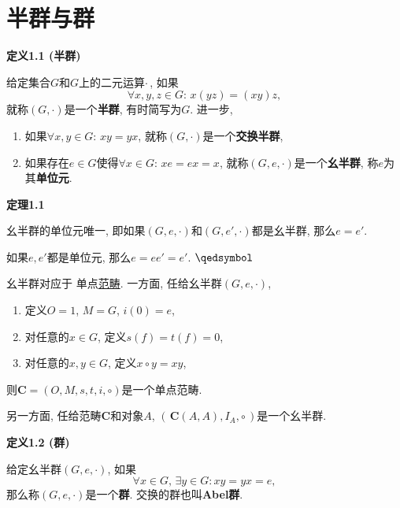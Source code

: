 \documentclass[UTF8]{ctexart}
\begin{document}
\setlength{\abovedisplayskip}{1pt}
\setlength{\belowdisplayskip}{1pt}

\section{半群与群}

\hypertarget{sec:定义1.1}{}
\noindent\textbf{定义1.1 (半群)}

给定集合$G$和$G$上的二元运算$\cdot$\,, 如果
\[
    \forall x,y,z\in G:\,x(yz)=(xy)z,
\]
就称$(G,\cdot)$是一个\textbf{半群}, 有时简写为$G$. 进一步,
\begin{enumerate}
    \item 如果$\forall x,y\in G:\,xy=yx$, 就称$(G,\cdot)$是一个\textbf{交换半群},
    \item 如果存在$e\in G$使得$\forall x\in G:\,xe=ex=x$,
    就称$(G,e,\cdot)$是一个\textbf{幺半群}, 称$e$为其\textbf{单位元}.
\end{enumerate}

\vspace{10pt}

\hypertarget{sec:定理1.1}{}
\noindent\textbf{定理1.1}

幺半群的单位元唯一, 即如果$(G,e,\cdot)$和$(G,e',\cdot)$都是幺半群, 那么$e=e'$.


如果$e,e'$都是单位元, 那么$e=ee'=e'$. \hfill $\qedsymbol$

\vspace{10pt}

幺半群对应于
单点\href{../../../02 范畴论/01 范畴、函子与自然变换/01 范畴#nameddest=sec:定义1.1}
{范畴}. 一方面, 任给幺半群$(G,e,\cdot)$,
\begin{enumerate}
    \item 定义$O=1$, $M=G$, $i(0)=e$,
    \item 对任意的$x\in G$, 定义$s(f)=t(f)=0$,
    \item 对任意的$x,y\in G$, 定义$x\circ y=xy$,
\end{enumerate}
则$\mathbf{C}=(O,M,s,t,i,\circ)$是一个单点范畴.

另一方面, 任给范畴$\mathbf{C}$和对象$A$,
$(\,\mathbf{C}(A,A),I_A,\circ\,)$是一个幺半群.

\vspace{10pt}

\hypertarget{sec:定义1.2}{}
\noindent\textbf{定义1.2 (群)}

给定幺半群$(G,e,\cdot)$, 如果
\[
    \forall x\in G,\,\exists y\in G:xy=yx=e,
\]
那么称$(G,e,\cdot)$是一个\textbf{群}. 交换的群也叫\textbf{Abel群}.
\end{document}
